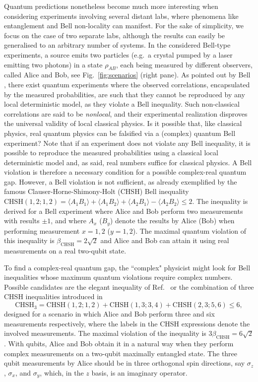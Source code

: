 \documentclass[onecolumn,prx,amsmath,amssymb]{revtex4-2}
\begin{document}
Quantum predictions nonetheless become much more interesting when considering experiments involving several distant labs, where phenomena like entanglement \cite{schroedinger} and Bell non-locality \cite{Bell1964} can manifest. For the sake of simplicity, we focus on the case of two separate labs, although the results can easily be generalised to an arbitrary number of systems. In the considered Bell-type experiments, a source emits two particles (e.g.~a crystal pumped by a laser emitting two photons) in a state $\rho_{AB}$, each being measured by different observers, called Alice and Bob, see Fig.~\ref{fig:scenarios} (right pane). As pointed out by Bell \cite{Bell1964}, there exist quantum experiments where the observed correlations, encapsulated by the measured probabilities, %
are such that they cannot be reproduced by any local deterministic model, as they violate a Bell inequality. Such non-classical correlations are said to be \emph{nonlocal}, and their experimental realization disproves the universal validity of local classical physics. 
Is it possible that, like classical physics, real quantum physics can be falsified via a (complex) quantum Bell experiment? Note that if an experiment does not violate any Bell inequality, it is possible to reproduce the measured probabilities using a classical local deterministic model and, as said, real numbers suffice for classical physics. A Bell violation is therefore a necessary condition for a possible complex-real quantum gap. However, a Bell violation is not sufficient, as already exemplified by the famous Clauser-Horne-Shimony-Holt (CHSH) Bell inequality~\cite{chsh} $\text{CHSH}(1,2;1,2)=\langle A_1B_1\rangle +\langle A_1B_2\rangle+\langle A_2B_1\rangle-\langle A_2B_2\rangle\leq 2$. The inequality is derived for a Bell experiment where Alice and Bob perform two measurements with results $\pm 1$, and where $A_x$ ($B_y$) denote the results by Alice (Bob) when performing measurement $x=1,2$ ($y=1,2$). The maximal quantum violation of this inequality is $\beta_\text{CHSH}=2\sqrt 2$ and Alice and Bob can attain it using real measurements on a real two-qubit state.

To find a complex-real quantum gap, the ``complex" physicist might look for  Bell inequalities whose maximum quantum violations require complex numbers. Possible candidates are the elegant inequality of Ref.~\cite{elegant} or the combination of three CHSH inequalities introduced in~\cite{optimal_ent_bit,self_testing}
\begin{equation}
\label{eq:chsh3}
\text{CHSH}_3=\text{CHSH}(1,2;1,2)+\text{CHSH}(1,3;3,4)+\text{CHSH}(2,3;5,6)\leq 6,
\end{equation}
designed for a scenario in which Alice and Bob perform three and six measurements respectively, where the labels in the CHSH expressions denote the involved measurements. The maximal violation of the inequality is $3\beta_\text{CHSH}=6\sqrt 2$. With qubits, Alice and Bob obtain it in a natural way when they perform complex measurements on a two-qubit maximally entangled state. The three qubit measurements by Alice should be in three orthogonal spin directions, say $\sigma_z$, $\sigma_x$, and $\sigma_y$, which, in the $z$ basis, is an imaginary operator. 
\end{document}
